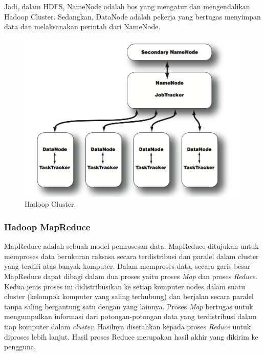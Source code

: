 Jadi, dalam HDFS, NameNode adalah bos yang mengatur dan mengendalikan Hadoop Cluster. Sedangkan, DataNode adalah pekerja yang bertugas menyimpan data dan melaksanakan perintah dari NameNode.

\begin{figure}
	\centering
	\includegraphics[scale=0.3]{Gambar/hadoop-cluster.png}
	\caption[Hadoop Cluster]{Hadoop Cluster.\cite{Lam:2010:HA:1965594}}
	\label{fig:hadoop-cluster}
\end{figure}
	
\subsubsection{Hadoop MapReduce}
\label{sec:hadoop_mapreduce}
MapReduce adalah sebuah model pemrosesan data\cite{Lam:2010:HA:1965594}. MapReduce ditujukan untuk memproses data berukuran raksasa secara terdistribusi dan paralel dalam cluster yang terdiri atas banyak komputer. Dalam memproses data, secara garis besar MapReduce dapat dibagi dalam dua proses yaitu proses \textit{Map} dan proses \textit{Reduce}. Kedua jenis proses ini didistribusikan ke setiap komputer nodes dalam suatu cluster (kelompok komputer yang saling terhubung) dan berjalan secara paralel tanpa saling bergantung satu dengan yang lainnya. Proses \textit{Map} bertugas untuk mengumpulkan informasi dari potongan-potongan data yang terdistribusi dalam tiap komputer dalam \textit{cluster}. Hasilnya diserahkan kepada proses \textit{Reduce} untuk diproses lebih lanjut. Hasil proses Reduce merupakan hasil akhir yang dikirim ke pengguna. \cite{Dean:2008:MSD:1327452.1327492}

